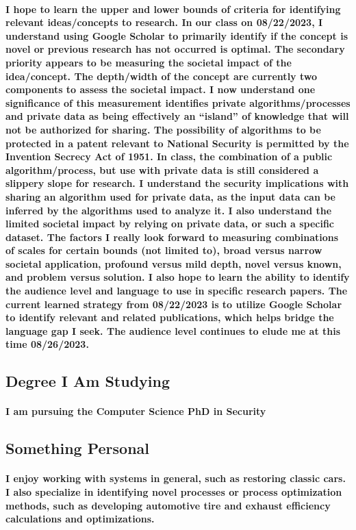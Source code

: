 \paragraph{\quad I hope to learn the upper and lower bounds of criteria for identifying relevant ideas/concepts to research. In our class on 08/22/2023, I understand using Google Scholar to primarily identify if the concept is novel or previous research has not occurred is optimal. The secondary priority appears to be measuring the societal impact of the idea/concept. The depth/width of the concept are currently two components to assess the societal impact. I now understand one significance of this measurement identifies private algorithms/processes and private data as being effectively an 
“island” of knowledge that will not be authorized for sharing. The possibility of algorithms to be protected in a patent relevant to National Security is permitted by the Invention Secrecy Act of 1951. In class, the combination of a public algorithm/process, but use with private data is still considered a slippery slope for research. I understand the security implications with sharing an algorithm used for private data, as the input data can be inferred by the algorithms used to analyze it. I also understand the limited societal impact by relying on private data, or such a specific dataset. The factors I really look forward to measuring combinations of scales for certain bounds (not limited to), broad versus narrow societal application, profound versus mild depth, novel versus known, and problem versus solution. I also hope to learn the ability to identify the audience level and language to use in specific research papers. The current learned strategy from 08/22/2023 is to utilize Google Scholar to identify relevant and related publications, which helps bridge the language gap I seek. The audience level continues to elude me at this time 08/26/2023.}
\subsection{Degree I Am Studying}
\paragraph{\quad I am pursuing the Computer Science PhD in Security}
\subsection{Something Personal}
\paragraph{\quad I enjoy working with systems in general, such as restoring classic cars. I also specialize in identifying novel processes or process optimization methods, such as developing automotive tire and exhaust efficiency calculations and optimizations.}

